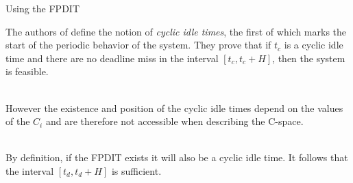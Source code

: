 \documentclass{beamer}
\begin{document}
    \begin{frame}{Using the FPDIT}

        The authors of \cite{choquet2004minimal} define the notion of \emph{cyclic idle times}, the first of which marks the start of the periodic behavior of the system. They prove that if $t_c$ is a cyclic idle time and there are no deadline miss in the interval $[t_c, t_c + H]$, then the system is feasible.

        ~\\

        However the existence and position of the cyclic idle times depend on the values of the $C_i$ and are therefore not accessible when describing the C-space.

        ~\\

        By definition, if the FPDIT exists it will also be a cyclic idle time. It follows that the interval $[t_d, t_d + H]$ is sufficient.

    \end{frame}
\end{document}

